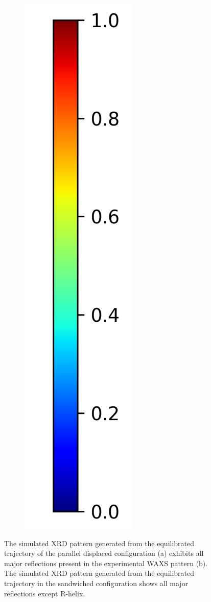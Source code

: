 \documentclass[journal=jpcbfk,manusciprt=article]{achemso}
\begin{document}
\begin{figure}
\begin{subfigure}{0.0544\linewidth}
        \includegraphics[width=\linewidth]{colorbar_jet.png}
  \end{subfigure}
  \caption{The simulated XRD pattern generated from the equilibrated trajectory
	  of the parallel displaced configuration (a) exhibits all major reflections
	  present in the experimental WAXS pattern (b). The simulated XRD pattern
	  generated from the equilibrated trajectory in the sandwiched configuration shows
	  all major reflections except R-helix.}
  \label{fig:XRDsim}
  \end{figure}
\end{document}
